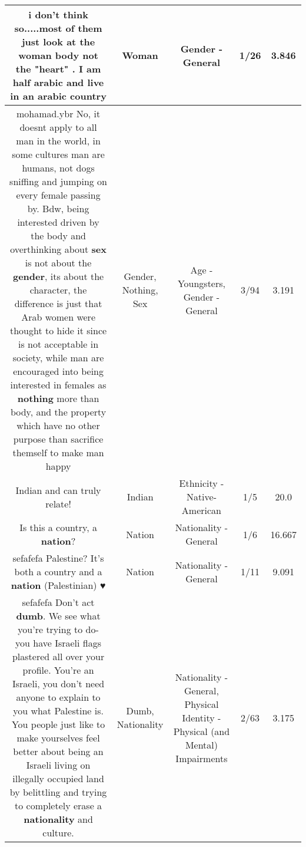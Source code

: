 \documentclass[11pt]{article}
\newlength\mylength
\begin{document}
\begin{center}
\begin{longtable}{|C{.65\mylength}|C{.30\mylength}|C{.12\mylength}|C{.12\mylength}|C{.12\mylength}|}
  \small i don't think so.....most of them just look at the \textbf{woman} body not the "heart" .  I am half arabic and live in an arabic country\normalsize   & Woman & Gender - General & 1/26 & 3.846 \\  \hline
  \small mohamad.ybr No, it doesnt apply to all man in the world, in some cultures man are humans, not dogs sniffing and jumping on every female passing by. Bdw, being interested driven by the body and overthinking about \textbf{sex} is not about the \textbf{gender}, its about the character, the difference is just that Arab women were thought to hide it since is not acceptable in society, while man are encouraged into being interested in females as \textbf{nothing} more than body, and the property which have no other purpose than sacrifice themself to make man happy\normalsize   & Gender, Nothing, Sex & Age - Youngsters, Gender - General & 3/94 & 3.191 \\  \hline
  \small Indian and can truly relate!\normalsize   & Indian & Ethnicity - Native-American & 1/5 & 20.0 \\  \hline
  \small Is this a country, a \textbf{nation}?\normalsize   & Nation & Nationality - General & 1/6 & 16.667 \\  \hline
  \small sefafefa Palestine? It's both a country and a \textbf{nation} (Palestinian) ♥️\normalsize   & Nation & Nationality - General & 1/11 & 9.091 \\  \hline
  \small sefafefa Don't act \textbf{dumb}. We see what you're trying to do- you have Israeli flags plastered all over your profile. You're an Israeli, you don't need anyone to explain to you what Palestine is. You people just like to make yourselves feel better about being an Israeli living on illegally occupied land by belittling and trying to completely erase a \textbf{nationality} and culture.\normalsize   & Dumb, Nationality & Nationality - General, Physical Identity - Physical (and Mental) Impairments & 2/63 & 3.175 \\  \hline

\end{longtable}
\end{center}
\end{document}
